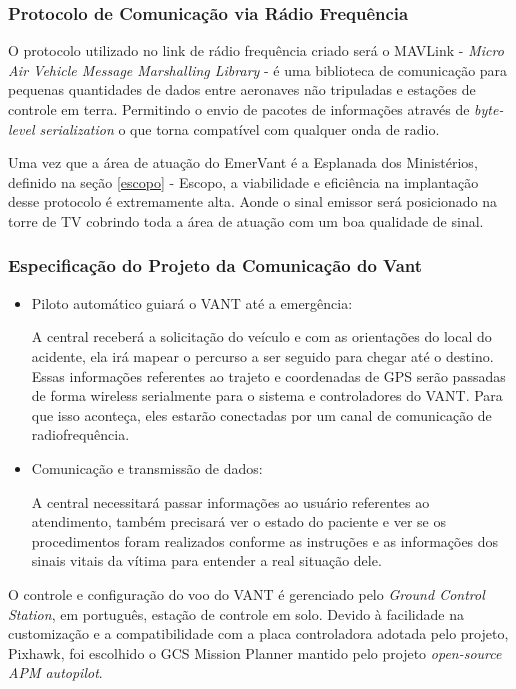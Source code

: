 \subsubsection{Protocolo de Comunicação via Rádio Frequência}

O protocolo utilizado no link de rádio frequência criado será o MAVLink - \textit{Micro Air Vehicle Message Marshalling Library} - é uma biblioteca de comunicação para 
pequenas quantidades de dados entre aeronaves não tripuladas e estações de controle em terra. 
Permitindo o envio de pacotes de informações através de \textit{byte-level serialization} o que torna 
compatível com qualquer onda de radio.\cite{mavlink}

Uma vez que a área de atuação do EmerVant é a Esplanada dos Ministérios, 
definido na seção \ref{escopo} - Escopo, a viabilidade e eficiência na implantação desse protocolo é
extremamente alta. Aonde o sinal emissor será posicionado na torre de TV cobrindo toda a 
área de atuação com um boa qualidade de sinal. 

\subsubsection{Especificação do Projeto da Comunicação do Vant}

\begin{itemize}
 \item Piloto automático guiará o VANT até a emergência: 

  A central receberá a solicitação do veículo e com as orientações do local do acidente, ela irá mapear o percurso a ser seguido para chegar até o destino.  Essas informações referentes ao trajeto e coordenadas de GPS serão passadas de forma wireless serialmente para o sistema e controladores do VANT. Para que isso aconteça, eles estarão conectadas por um canal de comunicação de radiofrequência. 

  \item Comunicação e transmissão de dados:

   A central necessitará passar informações ao usuário referentes ao atendimento, também precisará ver o estado do paciente e ver se os procedimentos foram realizados conforme as instruções e as informações dos sinais vitais da vítima para entender a real situação dele. 

\end{itemize}

O controle e configura\c{c}\~ao do voo do VANT \'e gerenciado pelo \textit{Ground Control Station}, em português, 
esta\c{c}\~ao de controle em solo. Devido à facilidade na customização e a compatibilidade com a placa controladora adotada pelo projeto, Pixhawk, foi escolhido o GCS Mission Planner mantido pelo projeto \textit{open-source  APM autopilot}. 
\cite{gcs}

